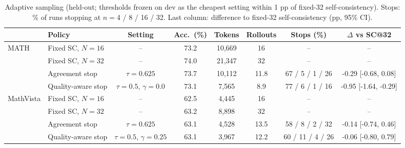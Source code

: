 \begin{table}[t]
\centering
\small
\caption{Adaptive sampling (held-out; thresholds frozen on dev as the cheapest setting within 1 pp of fixed-32 self-consistency). Stops: \% of runs stopping at $n{=}$4 / 8 / 16 / 32. Last column: difference to fixed-32 self-consistency (pp, 95\% CI).}
\label{tab:t3-adaptive}
\begin{adjustbox}{max width=\linewidth}
\begin{tabular}{llcccccc}
\toprule
 & Policy & Setting & Acc.\ (\%) & Tokens & Rollouts & Stops (\%) & $\Delta$ vs SC@32 \\
\midrule
MATH & Fixed SC, $N{=}16$ & -- & 73.2 & 10{,}669 & 16 & -- & -- \\
 & Fixed SC, $N{=}32$ & -- & 74.0 & 21{,}347 & 32 & -- & -- \\
 & Agreement stop & $\tau{=}0.625$ & 73.7 & 10{,}112 & 11.8 & 67 / 5 / 1 / 26 & -0.29 [-0.68, 0.08] \\
 & Quality-aware stop & $\tau{=}0.5$, $\gamma{=}0.0$ & 73.1 & 7{,}565 & 8.9 & 77 / 6 / 1 / 16 & -0.95 [-1.64, -0.29] \\
\midrule
MathVista & Fixed SC, $N{=}16$ & -- & 62.5 & 4{,}445 & 16 & -- & -- \\
 & Fixed SC, $N{=}32$ & -- & 63.2 & 8{,}898 & 32 & -- & -- \\
 & Agreement stop & $\tau{=}0.625$ & 63.1 & 4{,}528 & 13.5 & 58 / 8 / 2 / 32 & -0.14 [-0.74, 0.46] \\
 & Quality-aware stop & $\tau{=}0.5$, $\gamma{=}0.25$ & 63.1 & 3{,}967 & 12.2 & 60 / 11 / 4 / 26 & -0.06 [-0.80, 0.79] \\
\bottomrule
\end{tabular}
\end{adjustbox}
\end{table}
